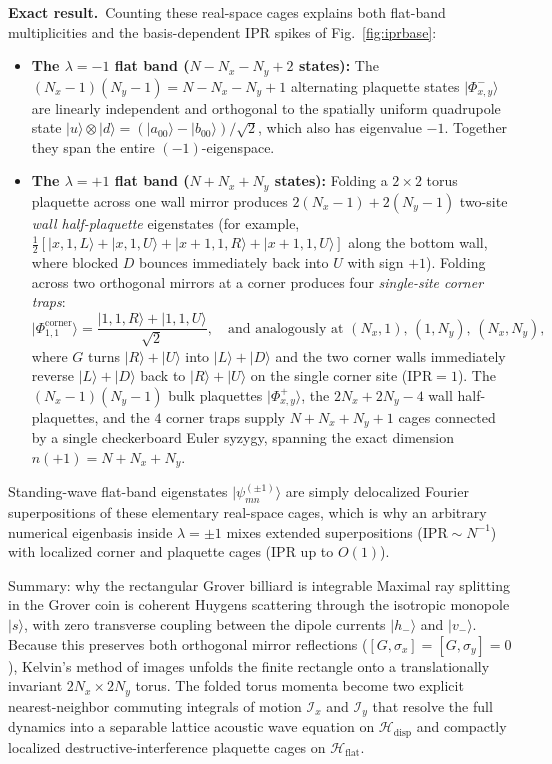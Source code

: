 \documentclass[11pt,a4paper,oneside]{report}
\newcommand{\ket}[1]{\lvert #1\rangle}
\newcommand{\HH}{\mathcal H}
\newcommand{\exact}{\textbf{Exact result.}\ }
\numberwithin{equation}{chapter}
\begin{document}
\exact Counting these real-space cages explains both flat-band multiplicities
and the basis-dependent IPR spikes of Fig.~\ref{fig:iprbase}:
\begin{itemize}
\item \textbf{The \(\lambda=-1\) flat band (\(N-N_x-N_y+2\) states):} The
\((N_x-1)(N_y-1)=N-N_x-N_y+1\) alternating plaquette states
\(\ket{\Phi^-_{x,y}}\) are linearly independent and orthogonal to the
spatially uniform quadrupole state
\(\ket u\otimes\ket d=(\ket{a_{00}}-\ket{b_{00}})/\sqrt2\), which also has
eigenvalue \(-1\). Together they span the entire \((-1)\)-eigenspace.
\item \textbf{The \(\lambda=+1\) flat band (\(N+N_x+N_y\) states):} Folding
a \(2\times2\) torus plaquette across one wall mirror produces \(2(N_x-1)+2(N_y-1)\)
two-site \emph{wall half-plaquette} eigenstates (for example,
\(\tfrac12[\ket{x,1,L}+\ket{x,1,U}+\ket{x+1,1,R}+\ket{x+1,1,U}]\) along the
bottom wall, where blocked \(D\) bounces immediately back into \(U\) with
sign \(+1\)). Folding across two orthogonal mirrors at a corner produces four
\emph{single-site corner traps}:
\begin{equation}
\ket{\Phi^{\mathrm{corner}}_{1,1}}=\frac{\ket{1,1,R}+\ket{1,1,U}}{\sqrt2},
\quad\text{and analogously at }(N_x,1),\,(1,N_y),\,(N_x,N_y),
\end{equation}
where \(G\) turns \(\ket R+\ket U\) into \(\ket L+\ket D\) and the two
corner walls immediately reverse \(\ket L+\ket D\) back to \(\ket R+\ket U\)
on the single corner site (\(\mathrm{IPR}=1\)). The \((N_x-1)(N_y-1)\) bulk
plaquettes \(\ket{\Phi^+_{x,y}}\), the \(2N_x+2N_y-4\) wall half-plaquettes,
and the \(4\) corner traps supply \(N+N_x+N_y+1\) cages connected by a
single checkerboard Euler syzygy, spanning the exact dimension
\(n(+1)=N+N_x+N_y\).
\end{itemize}
Standing-wave flat-band eigenstates \(\ket{\psi_{mn}^{(\pm1)}}\) are simply
delocalized Fourier superpositions of these elementary real-space cages,
which is why an arbitrary numerical eigenbasis inside \(\lambda=\pm1\) mixes
extended superpositions (\(\mathrm{IPR}\sim N^{-1}\)) with localized corner
and plaquette cages (\(\mathrm{IPR}\) up to \(O(1)\)).

\begin{lesson}{Summary: why the rectangular Grover billiard is integrable}
Maximal ray splitting in the Grover coin is coherent Huygens scattering
through the isotropic monopole \(\ket s\), with zero transverse coupling
between the dipole currents \(\ket{h_-}\) and \(\ket{v_-}\). Because this
preserves both orthogonal mirror reflections (\([G,\sigma_x]=[G,\sigma_y]=0\)),
Kelvin's method of images unfolds the finite rectangle onto a translationally
invariant \(2N_x\times2N_y\) torus. The folded torus momenta become two
explicit nearest-neighbor commuting integrals of motion \(\mathcal I_x\) and
\(\mathcal I_y\) that resolve the full dynamics into a separable lattice
acoustic wave equation on \(\HH_{\mathrm{disp}}\) and compactly localized
destructive-interference plaquette cages on \(\HH_{\mathrm{flat}}\).
\end{lesson}
\end{document}
